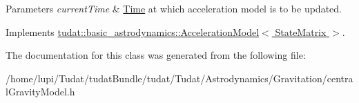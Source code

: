 \begin{DoxyParams}{Parameters}
{\em current\+Time} & \hyperlink{classtudat_1_1Time}{Time} at which acceleration model is to be updated. \\
\hline
\end{DoxyParams}


Implements \hyperlink{classtudat_1_1basic__astrodynamics_1_1AccelerationModel_a966e85b72300b8cbc99ba60e40108d71}{tudat\+::basic\+\_\+astrodynamics\+::\+Acceleration\+Model$<$ State\+Matrix $>$}.



The documentation for this class was generated from the following file\+:\begin{DoxyCompactItemize}
\item 
/home/lupi/\+Tudat/tudat\+Bundle/tudat/\+Tudat/\+Astrodynamics/\+Gravitation/central\+Gravity\+Model.\+h\end{DoxyCompactItemize}
